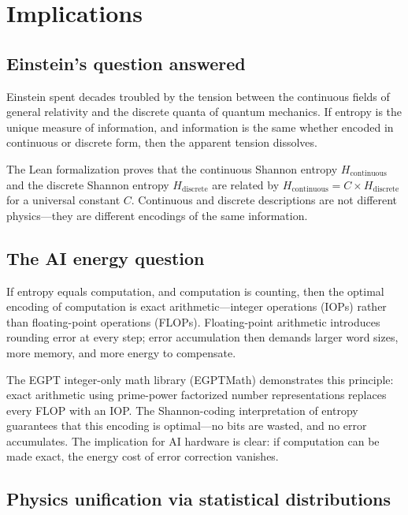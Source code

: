\documentclass[12pt,a4paper]{article}
\theoremstyle{definition}
\begin{document}
\section{Implications}
\label{sec:implications}

\subsection{Einstein's question answered}

Einstein spent decades troubled by the tension between the continuous
fields of general relativity and the discrete quanta of quantum
mechanics.  If entropy is the unique measure of information, and
information is the same whether encoded in continuous or discrete form,
then the apparent tension dissolves.

The Lean formalization proves that the continuous Shannon entropy
$H_{\mathrm{continuous}}$ and the discrete Shannon entropy
$H_{\mathrm{discrete}}$ are related by
$H_{\mathrm{continuous}} = C \times H_{\mathrm{discrete}}$ for a
universal constant $C$.  Continuous and discrete descriptions are not
different physics---they are different encodings of the same information.

\subsection{The AI energy question}

If entropy equals computation, and computation is counting, then the
optimal encoding of computation is exact arithmetic---integer operations
(IOPs) rather than floating-point operations (FLOPs).  Floating-point
arithmetic introduces rounding error at every step; error accumulation
then demands larger word sizes, more memory, and more energy to
compensate.

The EGPT integer-only math library (EGPTMath) demonstrates this
principle: exact arithmetic using prime-power factorized number
representations replaces every FLOP with an IOP.  The Shannon-coding
interpretation of entropy guarantees that this encoding is optimal---no
bits are wasted, and no error accumulates.  The implication for AI
hardware is clear: if computation can be made exact, the energy cost of
error correction vanishes.

\subsection{Physics unification via statistical distributions}
\end{document}
